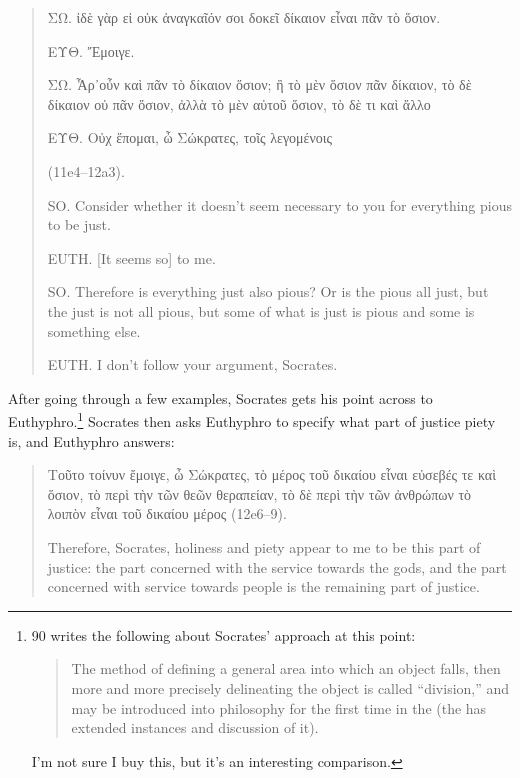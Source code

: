 \documentclass[11pt]{article}
\begin{document}
\begin{quote}

    {\g
    ΣΩ. ἰδὲ γὰρ εἰ οὐκ ἀναγκαῖόν σοι δοκεῖ δίκαιον εἶναι πᾶν τὸ ὅσιον.

    ΕΥΘ. Ἔμοιγε.

    ΣΩ. Ἆρ᾽οὖν καὶ πᾶν τὸ δίκαιον ὅσιον; ἢ τὸ μὲν ὅσιον πᾶν δίκαιον, τὸ δὲ
    δίκαιον οὐ πᾶν ὅσιον, ἀλλὰ τὸ μὲν αὐτοῦ ὅσιον, τὸ δὲ τι καὶ ἄλλο

    ΕΥΘ. Οὐχ ἕπομαι, ὦ Σώκρατες, τοῖς λεγομένοις
    } (11e4--12a3).

    SO. Consider whether it doesn't seem necessary to you for everything
    pious to be just.

    EUTH. [It seems so] to me.

    SO. Therefore is everything just also pious? Or is the pious all just,
    but the just is not all pious, but some of what is just is pious and
    some is something else.

    EUTH. I don't follow your argument, Socrates.

\end{quote}

After going through a few examples, Socrates gets his point across to
Euthyphro.\footnote{\citet{bailly2003} 90 writes the following about
Socrates' approach at this point:

\begin{quote}

    The method of defining a general area into which an object falls, then
    more and more precisely delineating the object is called ``division,''
    and may be introduced into philosophy for the first time in the
     (the  has extended instances and
    discussion of it).

\end{quote}

I'm not sure I buy this, but it's an interesting comparison.}  Socrates
then asks Euthyphro to specify what part of justice piety is, and Euthyphro
answers:

\begin{quote}

    {\g
    Τοῦτο τοίνυν ἔμοιγε, ὦ Σώκρατες, τὸ μέρος τοῦ δικαίου εἶναι εὐσεβές τε
    καὶ ὅσιον, τὸ περὶ τὴν τῶν θεῶν θεραπείαν, τὸ δὲ περὶ τὴν τῶν ἀνθρώπων
    τὸ λοιπὸν εἶναι τοῦ δικαίου μέρος
    } (12e6--9).

    Therefore, Socrates, holiness and piety appear to me to be this part of
    justice: the part concerned with the service towards the gods, and the
    part concerned with service towards people is the remaining part of
    justice.

\end{quote}
\end{document}
